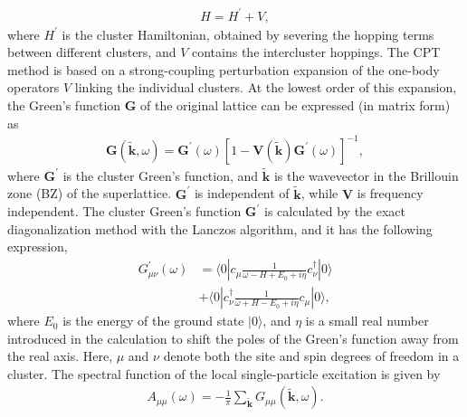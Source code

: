 \documentclass[aps,prl,reprint,groupedaddress,showpacs,amsfonts,amsmath,amssymb,superscriptaddress]{revtex4-1}
\begin{document}
\begin{align}
H=H^{\prime}+V,
\end{align}
where $H^{\prime}$ is the cluster Hamiltonian, obtained by severing the hopping terms between different clusters, and $V$ contains the intercluster hoppings. The CPT method is based on a strong-coupling perturbation expansion of the one-body operators $V$ linking the individual clusters\cite{PhysRevLett.84.522}. At the lowest order of this expansion, the Green's function $\bm{G}$ of the original lattice can be expressed (in matrix form) as
\begin{align}
\bm{G}(\tilde{\bm{k}},\omega)=\bm{G}^{\prime}(\omega)[1-\bm{V}(\tilde{\bm{k}})\bm{G}^{\prime}(\omega)]^{-1},
\end{align}
where $\bm{G}^{\prime}$ is the cluster Green's function, and $\tilde{\bm{k}}$ is the wavevector in the Brillouin zone (BZ) of the superlattice. $\bm{G}^{\prime}$ is independent of $\tilde{\bm{k}}$, while $\bm{V}$ is frequency independent. The cluster Green's function $\bm{G}^{\prime}$ is calculated by the exact diagonalization method with the Lanczos algorithm, and it has the following expression,
\begin{align}
G^{\prime}_{\mu\nu}(\omega)&=\langle0|c_{\mu}\frac{1}{\omega-H+E_{0}+i\eta}c^{\dag}_{\nu}|0\rangle \nonumber \\
&+\langle0|c^{\dag}_{\nu}\frac{1}{\omega+H-E_{0}+i\eta}c_{\mu}|0\rangle,
\end{align}
where $E_{0}$ is the energy of the ground state $|0\rangle$, and $\eta$ is a small real number introduced in the calculation to shift the poles of the Green's function away from the real axis. Here, $\mu$ and $\nu$ denote both the site and spin degrees of freedom in a cluster.
The spectral function of the local single-particle excitation is given by
\begin{align}
A_{\mu\mu}(\omega)=-\frac{1}{\pi}\sum_{\tilde{\bm{k}}}G_{\mu\mu}(\tilde{\bm{k}},\omega).
\end{align}


\end{document}

